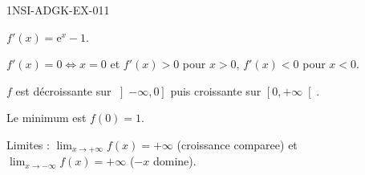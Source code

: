 \begin{corrige}{1NSI-ADGK-EX-011}

$f'(x) = \mathrm{e}^x - 1$.


$f'(x) = 0 \iff x = 0$ et $f'(x) > 0$ pour $x > 0$, $f'(x) < 0$ pour $x < 0$.

$f$ est décroissante sur $\left]-\infty, 0\right]$ puis croissante sur $\left[0, +\infty\right[$.

Le minimum est $f(0) = 1$.

Limites : $\lim_{x \to +\infty} f(x) = +\infty$ (croissance comparee) et $\lim_{x \to -\infty} f(x) = +\infty$ ($-x$ domine).

\end{corrige}
